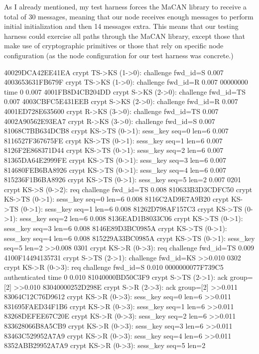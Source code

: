 As I already mentioned, my test harness forces the MaCAN library to receive a
total of 30 messages, meaning that our node receives enough messages to perform
initial initialization and then 14 messages extra. This means that our testing
harness could exercise all paths through the MaCAN library, except those that
make use of cryptographic primitives or those that rely on specific node
configuration (as the node configuration for our test harness was concrete.)

\midinsert {}
 40029DCA42EE41EA crypt TS->KS (1->0): challenge fwd_id=S
  0.007 4003653631FB679F crypt TS->KS (1->0): challenge fwd_id=R
  0.007 00000000         time 0
  0.007 4001FB8D4CB204DD crypt S->KS (2->0): challenge fwd_id=TS
  0.007 4003CBFC5E431EEB crypt S->KS (2->0): challenge fwd_id=R
  0.007 4001ED728E635600 crypt R->KS (3->0): challenge fwd_id=TS
  0.007 4002A90562E93EA7 crypt R->KS (3->0): challenge fwd_id=S
  0.007 81068C7BB634DCB8 crypt KS->TS (0->1): sess_key seq=0 len=6
  0.007 8116527F367675FE crypt KS->TS (0->1): sess_key seq=1 len=6
  0.007 8126F2E868371D44 crypt KS->TS (0->1): sess_key seq=2 len=6
  0.007 81365DA64E2999FE crypt KS->TS (0->1): sess_key seq=3 len=6
  0.007 814680FEB6BA8926 crypt KS->TS (0->1): sess_key seq=4 len=6
  0.007 815236F1B6BA8926 crypt KS->TS (0->1): sess_key seq=5 len=2
  0.007 0201             crypt KS->S (0->2): req challenge fwd_id=TS
  0.008 810633B3D3CDFC50 crypt KS->TS (0->1): sess_key seq=0 len=6
  0.008 8116C2AD9E7A9B20 crypt KS->TS (0->1): sess_key seq=1 len=6
  0.008 81262D798AF157C3 crypt KS->TS (0->1): sess_key seq=2 len=6
  0.008 8136EAD1B8033C06 crypt KS->TS (0->1): sess_key seq=3 len=6
  0.008 8146E89D3BC0985A crypt KS->TS (0->1): sess_key seq=4 len=6
  0.008 815229A33BC0985A crypt KS->TS (0->1): sess_key seq=5 len=2
>>0.008 0301             crypt KS->R (0->3): req challenge fwd_id=TS
  0.009 4100F14494135731 crypt S->TS (2->1): challenge fwd_id=KS
>>0.010 0302             crypt KS->R (0->3): req challenge fwd_id=S
  0.010 0000000077F739C5 authenticated time 0
  0.010 81040000BD50C3F9 crypt S->TS (2->1): ack group=[2]
>>0.010 83040000252D298E crypt S->R (2->3): ack group=[2]
>>0.011 83064C12C76D9612 crypt KS->R (0->3): sess_key seq=0 len=6
>>0.011 831695FAED34F1B6 crypt KS->R (0->3): sess_key seq=1 len=6
>>0.011 83268DEFEE67C20E crypt KS->R (0->3): sess_key seq=2 len=6
>>0.011 833628066B8A5CB9 crypt KS->R (0->3): sess_key seq=3 len=6
>>0.011 83463C529952A7A9 crypt KS->R (0->3): sess_key seq=4 len=6
>>0.011 8352ABB29952A7A9 crypt KS->R (0->3): sess_key seq=5 len=2
